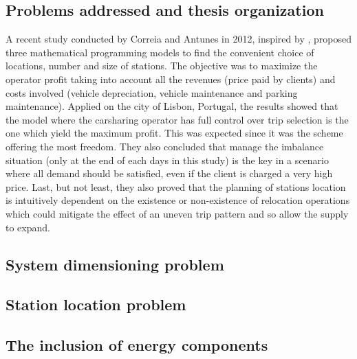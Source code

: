 \begin{bibunit}[ieeetr]
\section{Problems addressed and thesis organization}

A recent study conducted by Correia and Antunes \cite{correia_optimization_2012} in 2012, inspired by \cite{fan_carsharing_2008}, proposed three
mathematical programming models to find the convenient choice of locations, number and size
of stations.
The objective was to maximize the operator profit taking into account all the revenues (price paid by clients) and costs involved (vehicle depreciation, vehicle maintenance
and parking maintenance).
Applied on the city of Lisbon, Portugal, the results showed that the model where the carsharing operator has full control over trip selection is the one which yield the maximum profit.
This was expected since it was the scheme offering the most freedom.
They also concluded that manage the imbalance situation (only at the end of each days in this study) is the key in a scenario where all demand should be satisfied, even if the client is charged a very high price.
Last, but not least, they also proved that the planning of stations location is intuitively dependent on the existence or non-existence of relocation operations which could
mitigate the effect of an uneven trip pattern and so allow the supply to expand.

\subsection{System dimensioning problem}

\subsection{Station location problem}

\subsection{The inclusion of energy components}


\newpage
{}
\renewcommand{\bibname}{Bibliography of chapter \thechapter}
\end{bibunit}
